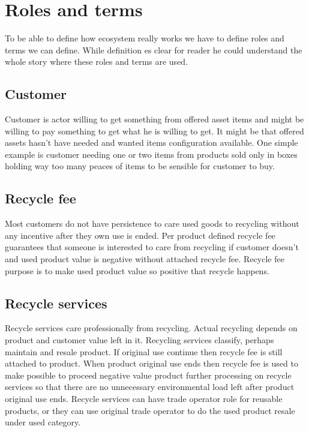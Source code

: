 \section{Roles and terms}
\label{roles_and_terms}
To be able to define how ecosystem really works we have to define roles and
terms we can define. While definition es clear for reader he could understand
the whole story where these roles and terms are used.

\subsection{Customer}
\label{customer}
Customer is actor willing to get something from offered asset items and might
be willing to pay something to get what he is willing to get. It might be that
offered assets hasn't have needed and wanted items configuration available.
One simple example is customer needing one or two items from products sold
only in boxes holding way too many peaces of items to be sensible for customer
to buy.

\subsection{Recycle fee}
\label{recycle_fee}
Most customers do not have persistence to care used goods to recycling without
any incentive after they own use is ended. Per product defined recycle fee
guarantees that someone is interested to care from recycling if customer
doesn't and used product value is negative without attached recycle fee.
Recycle fee purpose is to make used product value so positive that recycle
happens.

\subsection{Recycle services}
\label{recycle_services}
Recycle services care professionally from recycling. Actual recycling depends
on product and customer value left in it. Recycling services classify, perhaps
maintain and resale product. If original use continue then recycle fee is
still attached to product. When product original use ends then recycle fee is
used to make possible to proceed negative value product further processing on
recycle services so that there are no unnecessary environmental load left
after product original use ends. Recycle services can have trade operator role
for reusable products, or they can use original trade operator to do the used
product resale under used category.

